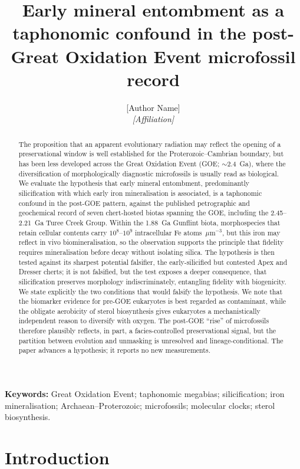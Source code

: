 \documentclass[11pt]{article}
\title{\vspace{-1.0cm}\textbf{Early mineral entombment as a taphonomic confound in the
post-Great Oxidation Event microfossil record}}
\author{[Author Name]\\
\small\textit{[Affiliation]}}
\date{}
\begin{document}
\maketitle

\begin{abstract}
\noindent The proposition that an apparent evolutionary radiation may reflect the opening of a
preservational window is well established for the Proterozoic--Cambrian boundary, but has been less
developed across the Great Oxidation Event (GOE; $\sim$2.4~Ga), where the diversification of
morphologically diagnostic microfossils is usually read as biological. We evaluate the hypothesis
that early mineral entombment, predominantly silicification with which early iron mineralisation is
associated, is a taphonomic confound in the post-GOE pattern, against the published petrographic and
geochemical record of seven chert-hosted biotas spanning the GOE, including the 2.45--2.21~Ga Turee
Creek Group. Within the 1.88~Ga Gunflint biota, morphospecies that retain cellular contents carry
$10^{8}$--$10^{9}$ intracellular Fe atoms~$\mu$m$^{-3}$, but this iron may reflect in vivo
biomineralisation, so the observation supports the principle that fidelity requires mineralisation
before decay without isolating silica. The hypothesis is then tested against its sharpest potential
falsifier, the early-silicified but contested Apex and Dresser cherts; it is not falsified, but the
test exposes a deeper consequence, that silicification preserves morphology indiscriminately,
entangling fidelity with biogenicity. We state explicitly the two conditions that would falsify the
hypothesis. We note that the biomarker evidence for pre-GOE eukaryotes is best regarded as
contaminant, while the obligate aerobicity of sterol biosynthesis gives eukaryotes a
mechanistically independent reason to diversify with oxygen. The post-GOE ``rise'' of microfossils
therefore plausibly reflects, in part, a facies-controlled preservational signal, but the partition
between evolution and unmasking is unresolved and lineage-conditional. The paper advances a
hypothesis; it reports no new measurements.
\end{abstract}

\noindent\textbf{Keywords:} Great Oxidation Event; taphonomic megabias; silicification; iron
mineralisation; Archaean--Proterozoic; microfossils; molecular clocks; sterol biosynthesis.

\section{Introduction}
\end{document}
